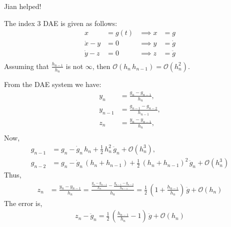 Jian helped! 

The index 3 DAE is given as follows:
\begin{align*}
	x &= g(t) & \implies x &= g\\
	\dot x - y &= 0 & \implies y &= \dot g\\
	\dot y - z &= 0 & \implies z &= \ddot g\\
\end{align*}
Assuming that $\frac{h_{n-1}}{h_n}$ is not $\infty$, then $\mathcal{O}(h_{n}\,h_{n-1}) = \mathcal{O}(h_n^2)$. 

From the DAE system we have:
\begin{align*}
	y_n &= \frac{g_n - g_{n-1}}{h_n},\\
	y_{n-1} &= \frac{g_{n-1} - g_{n-2}}{h_{n-1}},\\
	z_n &= \frac{y_n - y_{n-1}}{h_n},\\
\end{align*}
Now, 
\begin{align*}
	g_{n-1} &= g_n - \dot g_n\,h_n + \frac{1}{2}\,h_n^2\,\ddot g_n + \mathcal{O}(h_n^3),\\
	g_{n-2} &= g_n - \dot g_n\,\left(h_n + h_{n-1}\right) + \frac{1}{2}\,\left(h_n + h_{n-1}\right)^2\,\ddot g_n + \mathcal{O}(h_n^3)
\end{align*}
Thus, 
\begin{align*}
	z_n &= \frac{y_n - y_{n-1}}{h_n} = \frac{\frac{g_n - g_{n-1}}{h_n} - \frac{g_{n-1} - g_{n-2}}{h_{n-1}}}{h_n} =  \frac{1}{2}\,\left(1+\frac{h_{n-1}}{h_n}\right)\,\ddot g + \mathcal{O}(h_n)
\end{align*}
The error is,
\begin{align*}
	z_n - \ddot g_n = \frac{1}{2}\,\left(\frac{h_{n-1}}{h_n} - 1 \right)\,\ddot g + \mathcal{O}(h_n)
\end{align*}
